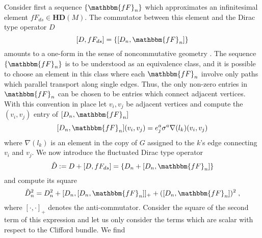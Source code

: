 \documentclass[12pt]{article}
\newcommand{\nn}{\nonumber}
\def\cl{{\cal L}}
\begin{document}
Consider first a sequence $\{\mathbbm{fF}_{n}\}$ which approximates an infinitesimal element $fF_{ds}\in \mathbf{HD}(M) $. The commutator between this element and the Dirac type operator $D$
$$
 [D,fF_{ds}] = \{ [D_n,\mathbbm{fF}_{n}] \}
$$
amounts to a one-form in the sense of noncommutative geometry \cite{ConnesBook}. 
The sequence $\{\mathbbm{fF}_{n}\}$ is to be understood as an equivalence class, and it is possible to choose an element in this class where each $\mathbbm{fF}_{n}$ involve only paths which parallel transport along single edges. Thus, the only non-zero entries in $\mathbbm{fF}_{n}$ can be chosen to be entries which connect adjacent vertices. With this  convention in place let $v_i,v_j$ be adjacent vertices and compute the $(v_i,v_j)$ entry of $ [D_n,\mathbbm{fF}_{n}] $
$$
 [D_n,\mathbbm{fF}_{n}] (v_i,v_j) = 
e^a_j \sigma^a \nabla(l_k) (v_i,v_j)
$$
where $\nabla(l_k)$ is an element in the copy of $G$ assigned to the $k$'s edge connecting $v_i$ and $v_j$.
We now introduce the fluctuated Dirac type operator
$$
\tilde{D} := D +  [D,fF_{ds}]   =\{D_n + [D_n, \mathbbm{fF}_{n} ] \}
$$
and compute its square
\begin{equation}
\tilde{D}_n^2 = D_n^2 + [D_n,  [D_n, \mathbbm{fF}_{n} ]   ]_+ +  ([D_n, \mathbbm{fF}_{n} ] )^2 \;,
\label{Dtilde2}
\nn
\end{equation}
where $[\cdot,\cdot]_+$ denotes the anti-commutator. Consider the square of the second term of this expression and let us only consider the terms which are scalar with respect to the Clifford bundle. %
We find
\end{document}
